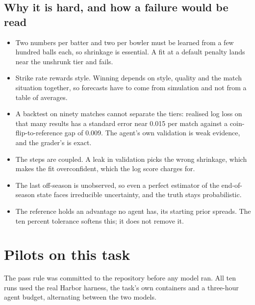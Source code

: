 \documentclass[11pt,letterpaper]{article}
\begin{document}
\subsection{Why it is hard, and how a failure would be read}

\begin{itemize}[leftmargin=1.4em, itemsep=2pt]
\item Two numbers per batter and two per bowler must be learned from a few hundred balls each, so shrinkage is essential. A fit at a default penalty lands near the unshrunk tier and fails.
\item Strike rate rewards style. Winning depends on style, quality and the match situation together, so forecasts have to come from simulation and not from a table of averages.
\item A backtest on ninety matches cannot separate the tiers: realised log loss on that many results has a standard error near 0.015 per match against a coin-flip-to-reference gap of 0.009. The agent's own validation is weak evidence, and the grader's is exact.
\item The steps are coupled. A leak in validation picks the wrong shrinkage, which makes the fit overconfident, which the log score charges for.
\item The last off-season is unobserved, so even a perfect estimator of the end-of-season state faces irreducible uncertainty, and the truth stays probabilistic.
\item The reference holds an advantage no agent has, its starting prior spreads. The ten percent tolerance softens this; it does not remove it.
\end{itemize}

\section{Pilots on this task}

The pass rule was committed to the repository before any model ran. All ten runs used the real Harbor harness, the task's own containers and a three-hour agent budget, alternating between the two models.
\end{document}
